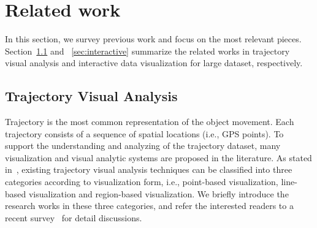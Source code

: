 \section{Related work}\label{sec:rel}
In this section, we survey previous work and focus on the most relevant pieces.
Section~\ref{sec:trajvisana} and ~\ref{sec:interactive} summarize the related works in trajectory visual analysis and interactive data visualization for large dataset, respectively.

\subsection{Trajectory Visual Analysis}\label{sec:trajvisana}
Trajectory is the most common representation of the object movement.
Each trajectory consists of a sequence of spatial locations (i.e., GPS points).
To support the understanding and analyzing of the trajectory dataset,
many visualization and visual analytic systems are proposed in the literature.
As stated in~\cite{chen2015survey}, existing trajectory visual analysis techniques can be classified into three categories according to visualization form,
i.e., point-based visualization, line-based visualization and region-based visualization.
We briefly introduce the research works in these three categories, and refer the interested readers to a recent survey~\cite{chen2015survey} for detail discussions.

